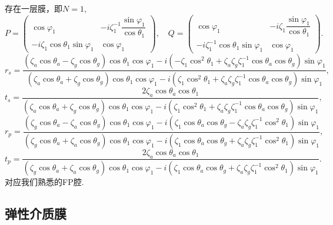 \begin{example}
	存在一层膜，即\(N = 1\),
	\begin{equation*}
		P =
		\begin{pmatrix}
			\cos\varphi_1                        & -i\zeta_1^{-1}\dfrac{\sin\varphi_1}{\cos\theta_1} \\
			-i\zeta_1 \cos\theta_1 \sin\varphi_1 & \cos\varphi_1
		\end{pmatrix},\quad
		Q =
		\begin{pmatrix}
			\cos\varphi_1                             & -i\zeta_1\dfrac{\sin\varphi_1}{\cos\theta_1} \\
			-i\zeta_1^{-1} \cos\theta_1 \sin\varphi_1 & \cos\varphi_1
		\end{pmatrix}.
	\end{equation*}
	\begin{equation*}
		r_s = \dfrac{(\zeta_a \cos\theta_a - \zeta_g \cos\theta_g)\cos\theta_1 \cos\varphi_1 - i(-\zeta_1 \cos^2\theta_1 + \zeta_a\zeta_g\zeta_1^{-1}\cos\theta_a\cos\theta_g)\sin\varphi_1}{(\zeta_a \cos\theta_a + \zeta_g \cos\theta_g)\cos\theta_1 \cos\varphi_1 - i(\zeta_1 \cos^2\theta_1 + \zeta_a\zeta_g\zeta_1^{-1}\cos\theta_a\cos\theta_g)\sin\varphi_1},
	\end{equation*}
	\begin{equation*}
		t_s = \dfrac{2\zeta_a \cos\theta_a \cos\theta_1}{(\zeta_a \cos\theta_a + \zeta_g \cos\theta_g)\cos\theta_1 \cos\varphi_1 - i(\zeta_1 \cos^2\theta_1 + \zeta_a\zeta_g\zeta_1^{-1}\cos\theta_a\cos\theta_g)\sin\varphi_1},
	\end{equation*}
	\begin{equation*}
		r_p = \dfrac{(\zeta_g \cos\theta_a - \zeta_a \cos\theta_g)\cos\theta_1 \cos\varphi_1 - i(\zeta_1 \cos\theta_a\cos\theta_g - \zeta_a\zeta_g\zeta_1^{-1}\cos^2\theta_1)\sin\varphi_1}{(\zeta_g \cos\theta_a + \zeta_a \cos\theta_g)\cos\theta_1 \cos\varphi_1 - i(\zeta_1 \cos\theta_a\cos\theta_g + \zeta_a\zeta_g\zeta_1^{-1}\cos^2\theta_1)\sin\varphi_1},
	\end{equation*}
	\begin{equation*}
		t_p = \dfrac{2\zeta_a \cos\theta_a \cos\theta_1}{(\zeta_g \cos\theta_a + \zeta_a \cos\theta_g)\cos\theta_1 \cos\varphi_1 - i(\zeta_1 \cos\theta_a\cos\theta_g + \zeta_a\zeta_g\zeta_1^{-1}\cos^2\theta_1)\sin\varphi_1}.
	\end{equation*}
	对应我们熟悉的FP腔.
\end{example}

\subsection{弹性介质膜}

